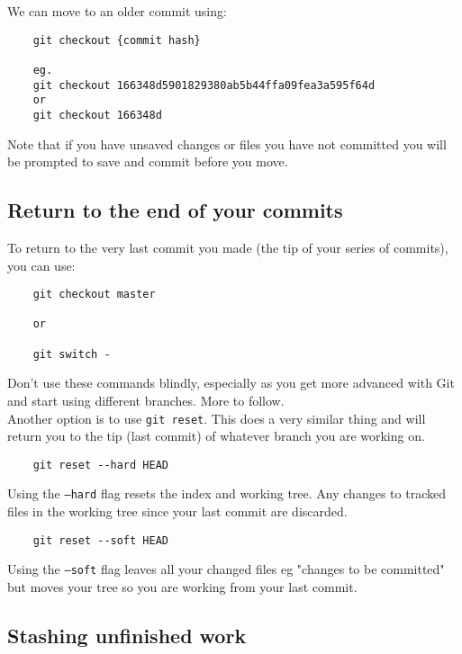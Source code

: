 We can move to an older commit using:

\begin{verbatim}
    git checkout {commit hash}

    eg.
    git checkout 166348d5901829380ab5b44ffa09fea3a595f64d
    or
    git checkout 166348d
\end{verbatim}

Note that if you have unsaved changes or files you have not committed you will be prompted to save and commit before you move.
\\

\subsection{Return to the end of your commits}

To return to the very last commit you made (the tip of your series of commits), you can use:

\begin{verbatim}
    git checkout master

    or

    git switch -
\end{verbatim}

Don't use these commands blindly, especially as you get more advanced with Git and start using different branches. More to follow.
\\

Another option is to use \texttt{git reset}. This does a very similar thing and will return you to the tip (last commit) of whatever branch you are working on.

\begin{verbatim}
    git reset --hard HEAD
\end{verbatim}

Using the \texttt{--hard} flag resets the index and working tree. Any changes to tracked files in the working tree since your last commit are discarded.

\begin{verbatim}
    git reset --soft HEAD
\end{verbatim}

Using the \texttt{--soft} flag leaves all your changed files eg "changes to be committed" but moves your tree so you are working from your last commit.
\\

\subsection{Stashing unfinished work}

